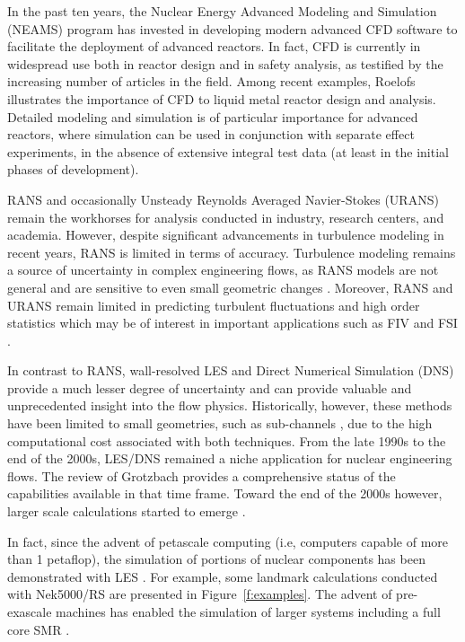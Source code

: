 In the past ten years, the Nuclear Energy Advanced Modeling and Simulation
(NEAMS) program \cite{sofu2017us} has invested in developing modern advanced
CFD software to facilitate the deployment of advanced reactors. In fact, CFD is
currently in widespread use both in reactor design and in safety analysis, as
testified by the increasing number of articles in the field. Among recent
examples, Roelofs \cite{roelofs2018thermal} illustrates the importance of CFD
to liquid metal reactor design and analysis. Detailed modeling and simulation
is of particular importance for advanced reactors, where simulation can be used
in conjunction with separate effect experiments, in the absence of extensive
integral test data (at least in the initial phases of development).

RANS \cite{conner2010cfd} and occasionally Unsteady Reynolds Averaged
Navier-Stokes (URANS) remain the workhorses for analysis conducted in industry,
research centers, and academia.  However, despite significant advancements in
turbulence modeling in recent years, RANS is limited in terms of accuracy.
Turbulence modeling remains a source of uncertainty in complex engineering
flows, as RANS models are not general and are sensitive to even small geometric
changes \cite{merzari2010numerical}. Moreover, RANS and URANS remain limited in
predicting turbulent fluctuations and high order statistics which may be of
interest in important applications such as FIV and
FSI \cite{yuan2017flow}.

In contrast to RANS, wall-resolved LES and Direct Numerical Simulation (DNS)
provide a much lesser degree of uncertainty and can provide valuable and
unprecedented insight into the flow physics. Historically, however, these
methods have been limited to small geometries, such as sub-channels
\cite{grotzbach1999direct}, due to the high computational cost associated with
both techniques. From the late 1990s to the end of the 2000s, LES/DNS remained
a niche application for nuclear engineering flows. The review of Grotzbach
\cite{grotzbach1999direct} provides a comprehensive status of the capabilities
available in that time frame. Toward the end of the 2000s however, larger scale
calculations started to emerge \cite{pointer2009simulations}.

In fact, since the advent of petascale computing (i.e, computers
capable of more than 1 petaflop), the simulation of portions of nuclear
components has been demonstrated with LES \cite{merzari2017large}.
For example, some landmark calculations conducted with Nek5000/RS are presented in
Figure~\ref{f:examples}. The advent of pre-exascale machines has enabled the simulation of larger systems including a full core SMR \cite{Fang2021}.

